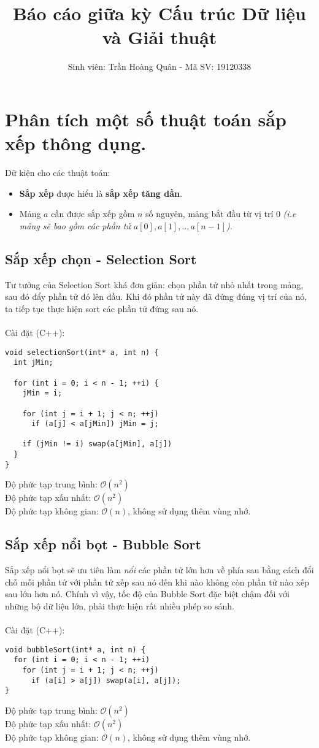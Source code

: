 \documentclass[]{article}
\title{Báo cáo giữa kỳ Cấu trúc Dữ liệu và Giải thuật}
\author{Sinh viên: Trần Hoàng Quân - Mã SV: 19120338}
\begin{document}
\maketitle
\tableofcontents
\pagebreak

\section{Phân tích một số thuật toán sắp xếp thông dụng.}
Dữ kiện cho các thuật toán:
\begin{itemize}
\item \textbf{Sắp xếp} được hiểu là \textbf{sắp xếp tăng dần}.
\item Mảng $a$ cần được sắp xếp gồm $n$ số nguyên, mảng bắt đầu từ vị trí 0 \textit{(i.e mảng sẽ bao gồm các phần tử $a[0], a[1], .., a[n - 1]$)}.

\end{itemize}
\subsection{Sắp xếp chọn - Selection Sort}
Tư tưởng của Selection Sort khá đơn giản: chọn phần tử nhỏ nhất trong mảng, sau đó đẩy phần tử đó lên đầu. Khi đó phần tử này đã đứng đúng vị trí của nó, ta tiếp tục thực hiện sort các phần tử đứng sau nó.
\\\\
Cài đặt (C++):
\begin{lstlisting}
void selectionSort(int* a, int n) {
  int jMin;

  for (int i = 0; i < n - 1; ++i) {
    jMin = i;

    for (int j = i + 1; j < n; ++j)
      if (a[j] < a[jMin]) jMin = j;

    if (jMin != i) swap(a[jMin], a[j])
  }
}
\end{lstlisting}
Độ phức tạp trung bình: $\mathcal{O}(n^2)$
\\
Độ phức tạp xấu nhất: $\mathcal{O}(n^2)$
\\
Độ phức tạp không gian: $\mathcal{O}(n)$, không sử dụng thêm vùng nhớ.
\subsection{Sắp xếp nổi bọt - Bubble Sort}
Sắp xếp nổi bọt sẽ ưu tiên làm \textit{nổi} các phần tử lớn hơn về phía sau bằng cách đổi chỗ mỗi phần tử với phần tử xếp sau nó đến khi nào không còn phần tử nào xếp sau lớn hơn nó. Chính vì vậy, tốc độ của Bubble Sort đặc biệt chậm đối với những bộ dữ liệu lớn, phải thực hiện rất nhiều phép so sánh.
\\\\
Cài đặt (C++):
\begin{lstlisting}
void bubbleSort(int* a, int n) {
  for (int i = 0; i < n - 1; ++i)
    for (int j = i + 1; j < n; ++j)
      if (a[i] > a[j]) swap(a[i], a[j]);
}
\end{lstlisting}
Độ phức tạp trung bình: $\mathcal{O}(n^2)$
\\
Độ phức tạp xấu nhất: $\mathcal{O}(n^2)$
\\
Độ phức tạp không gian: $\mathcal{O}(n)$, không sử dụng thêm vùng nhớ.
\end{document}
